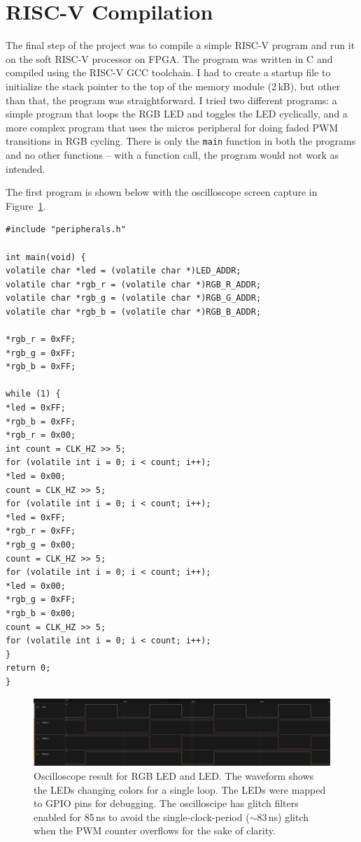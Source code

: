 \section{RISC-V Compilation}

The final step of the project was to compile a simple RISC-V program and run it on the soft RISC-V processor on FPGA.
The program was written in C and compiled using the RISC-V GCC toolchain.
I had to create a startup file to initialize the stack pointer to the top of the memory module (2\,kB), but other than that, the program was straightforward.
I tried two different programs: a simple program that loops the RGB LED and toggles the LED cyclically, and a more complex program that uses the micros peripheral for doing faded PWM transitions in RGB cycling.
There is only the \texttt{main} function in both the programs and no other functions -- with a function call, the program would not work as intended.

The first program is shown below with the oscilloscope screen capture in Figure~\ref{fig:rgb_led_oscilloscope}.

\begin{verbatim}
#include "peripherals.h"

int main(void) {
volatile char *led = (volatile char *)LED_ADDR;
volatile char *rgb_r = (volatile char *)RGB_R_ADDR;
volatile char *rgb_g = (volatile char *)RGB_G_ADDR;
volatile char *rgb_b = (volatile char *)RGB_B_ADDR;

*rgb_r = 0xFF;
*rgb_g = 0xFF;
*rgb_b = 0xFF;

while (1) {
*led = 0xFF;
*rgb_b = 0xFF;
*rgb_r = 0x00;
int count = CLK_HZ >> 5;
for (volatile int i = 0; i < count; i++);
*led = 0x00;
count = CLK_HZ >> 5;
for (volatile int i = 0; i < count; i++);
*led = 0xFF;
*rgb_r = 0xFF;
*rgb_g = 0x00;
count = CLK_HZ >> 5;
for (volatile int i = 0; i < count; i++);
*led = 0x00;
*rgb_g = 0xFF;
*rgb_b = 0x00;
count = CLK_HZ >> 5;
for (volatile int i = 0; i < count; i++);
}
return 0;
}
\end{verbatim}

\begin{figure}[H]
    \centering
    \includegraphics[width=\textwidth]{media/rgb_led_oscilloscope}
    \caption{Oscilloscope result for RGB LED and LED. The waveform shows the LEDs changing colors for a single loop. The LEDs were mapped to GPIO pins for debugging. The oscilloscipe has glitch filters enabled for 85\,ns to avoid the single-clock-period ($\sim$83\,ns) glitch when the PWM counter overflows for the sake of clarity.}
    \label{fig:rgb_led_oscilloscope}
\end{figure}